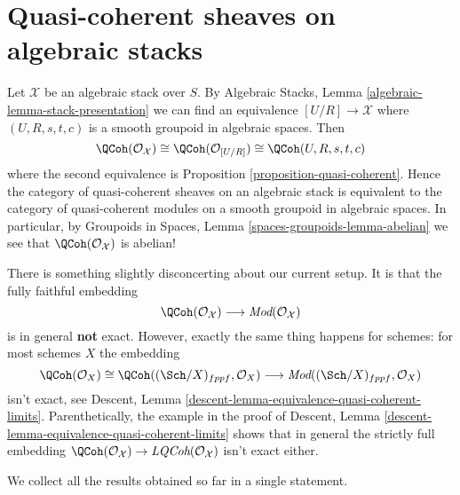 \section{Quasi-coherent sheaves on algebraic stacks}
\label{section-quasi-coherent-algebraic-stacks}

\noindent
Let $\mathcal{X}$ be an algebraic stack over $S$. By
Algebraic Stacks, Lemma \ref{algebraic-lemma-stack-presentation}
we can find an equivalence $[U/R] \to \mathcal{X}$
where $(U, R, s, t, c)$ is a smooth groupoid in algebraic spaces.
Then
$$
\QCoh(\mathcal{O}_\mathcal{X})
\cong
\QCoh(\mathcal{O}_{[U/R]})
\cong
\QCoh(U, R, s, t, c)
$$
where the second equivalence is
Proposition \ref{proposition-quasi-coherent}.
Hence the category of quasi-coherent sheaves on an algebraic stack
is equivalent to the category of quasi-coherent modules on a smooth
groupoid in algebraic spaces. In particular, by
Groupoids in Spaces, Lemma \ref{spaces-groupoids-lemma-abelian}
we see that $\QCoh(\mathcal{O}_\mathcal{X})$ is abelian!

\medskip\noindent
There is something slightly disconcerting about our current setup.
It is that the fully faithful embedding
$$
\QCoh(\mathcal{O}_\mathcal{X})
\longrightarrow
\textit{Mod}(\mathcal{O}_\mathcal{X})
$$
is in general {\bf not} exact. However, exactly the same thing happens
for schemes: for most schemes $X$ the embedding
$$
\QCoh(\mathcal{O}_X) \cong
\QCoh((\Sch/X)_{fppf}, \mathcal{O}_X) \longrightarrow
\textit{Mod}((\Sch/X)_{fppf}, \mathcal{O}_X)
$$
isn't exact, see
Descent, Lemma \ref{descent-lemma-equivalence-quasi-coherent-limits}.
Parenthetically, the example in the proof of
Descent, Lemma \ref{descent-lemma-equivalence-quasi-coherent-limits}
shows that in general the strictly full embedding
$\QCoh(\mathcal{O}_\mathcal{X}) \to
\textit{LQCoh}(\mathcal{O}_\mathcal{X})$ isn't exact either.

\medskip\noindent
We collect all the results obtained so far in a single statement.

